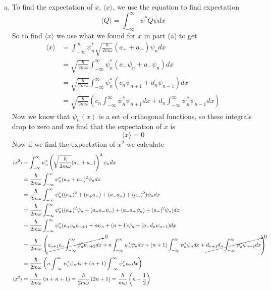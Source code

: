 \documentclass[11pt]{article}
\numberwithin{equation}{section}
\newcommand{\expt}[1]{\langle{#1}\rangle}
\begin{document}
\begin{enumerate}[(a)]
\item
To find the expectation of $x$, $\expt{x}$, we use the equation to find expectation
\begin{equation}
\expt{Q} = \int_{-\infty}^{\infty}\psi^*Q\psi dx
\label{expt}
\end{equation}
So to find $\expt{x}$ we use what we found for $x$ in part (a) to get
\begin{align*}
\expt{x} &= \int_{-\infty}^{\infty}\psi_n^*\sqrt{\frac{\hbar}{2m\omega}}(a_++a_-)\psi_ndx\\
&= \sqrt{\frac{\hbar}{2m\omega}}\int_{-\infty}^{\infty}\psi_n^*(a_+\psi_n+a_-\psi_n)dx\\
&= \sqrt{\frac{\hbar}{2m\omega}}\int_{-\infty}^{\infty}\psi_n^*(c_n\psi_{n+1}+d_n\psi_{n-1})dx\\
&= \sqrt{\frac{\hbar}{2m\omega}}\left(c_n\int_{-\infty}^{\infty}\psi_n^*\psi_{n+1}dx+d_n\int_{-\infty}^{\infty}\psi^*_n\psi_{n-1}dx\right)
\end{align*}
Now we know that $\psi_n(x)$ is a set of orthogonal functions, so these integrals drop to zero and we find that the expectation of $x$ is
$$\expt{x} = 0$$
Now if we find the expectation of $x^2$ we calculate
\begin{align*}
\expt{x^2} &= \int_{-\infty}^{\infty}\psi_n^*\left(\sqrt{\frac{\hbar}{2m\omega}}(a_++a_-)\right)^2\psi_ndx\\
&= \frac{\hbar}{2m\omega}\int_{-\infty}^{\infty}\psi_n^*(a_++a_-)^2\psi_ndx\\
&= \frac{\hbar}{2m\omega}\int_{-\infty}^{\infty}\psi_n^*((a_+)^2+(a_+a_-)+(a_-a_+)+(a_-)^2)\psi_ndx\\
&= \frac{\hbar}{2m\omega}\int_{-\infty}^{\infty}\psi_n^*((a_+)^2\psi_n+(a_+a_-\psi_n)+(a_-a_+\psi_n)+(a_-)^2\psi_n)dx\\
&= \frac{\hbar}{2m\omega}\int_{-\infty}^{\infty}\psi_n^*(a_+c_n\psi_{n+1}+n\psi_n+(n+1)\psi_n+(a_-d_n\psi_{n-1})dx\\
&= \frac{\hbar}{2m\omega}\left(\cancelto{0}{c_{n+1}c_n\int_{-\infty}^{\infty}\psi_n^*\psi_{n+2}dx}+n\int_{-\infty}^{\infty}\psi_n^*\psi_ndx+(n+1)\int_{-\infty}^{\infty}\psi_n^*\psi_ndx+\cancelto{0}{d_{n+1}d_n\int_{-\infty}^{\infty}\psi_n^*\psi_{n-2}dx}\right)\\
&= \frac{\hbar}{2m\omega}\left(n\int_{-\infty}^{\infty}\psi_n^*\psi_ndx+(n+1)\int_{-\infty}^{\infty}\psi_n^*\psi_ndx\right)\\
\expt{x^2} &= \frac{\hbar}{2m\omega}\left(n+n+1\right) = \frac{\hbar}{2m\omega}\left(2n+1\right) = \frac{\hbar}{m\omega}\left(n+\frac{1}{2}\right)

\end{align*}
\end{enumerate}
\end{document}

